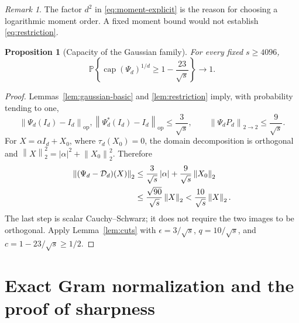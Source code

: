 \documentclass[11pt]{article}
\newtheorem{proposition}[theorem]{Proposition}
\theoremstyle{remark}
\newtheorem{remark}[theorem]{Remark}
\DeclareMathOperator{\capop}{cap}
\newcommand{\Prob}{\mathbb P}
\newcommand{\Dep}{\mathcal D}
\newcommand{\op}{\mathrm{op}}
\newcommand{\hs}{2\to2}
\newcommand{\norm}[1]{\left\lVert#1\right\rVert}
\newcommand{\abs}[1]{\left\lvert#1\right\rvert}
\begin{document}
\begin{remark}
The factor $d^2$ in \eqref{eq:moment-explicit} is the reason
for choosing a logarithmic moment order. A fixed moment bound
would not establish \eqref{eq:restriction}.
\end{remark}

\begin{proposition}[Capacity of the Gaussian family]\label{prop:randomcap}
For every fixed $s\geq4096$,
\begin{equation}
 \Prob\left\{
  \capop(\Psi_d)^{1/d}\geq1-\frac{23}{\sqrt{s}}
       \right\}\longrightarrow1. \label{eq:randomcap}
\end{equation}
\end{proposition}

\begin{proof}
Lemmas~\ref{lem:gaussian-basic} and \ref{lem:restriction} imply,
with probability tending to one,
\[
 \norm{\Psi_d(I_d)-I_d}_{\op},
 \norm{\Psi_d^*(I_d)-I_d}_{\op}\leq\frac3{\sqrt{s}},
 \qquad
 \norm{\Psi_dP_d}_{\hs}\leq\frac9{\sqrt{s}}.
\]
For $X=\alpha I_d+X_0$, where $\tau_d(X_0)=0$, the domain
decomposition is orthogonal and
$\norm{X}_2^2=\abs{\alpha}^2+\norm{X_0}_2^2$. Therefore
\begin{align}
 \norm{(\Psi_d-\Dep_d)(X)}_2
  &\leq\frac3{\sqrt{s}}\abs{\alpha}
                 +\frac9{\sqrt{s}}\norm{X_0}_2 \notag\\
  &\leq\frac{\sqrt{90}}{\sqrt{s}}\norm{X}_2
   <\frac{10}{\sqrt{s}}\norm{X}_2. \label{eq:orthogonal-domain}
\end{align}
The last step is scalar Cauchy--Schwarz; it does not require
the two images to be orthogonal.
Apply Lemma~\ref{lem:cuts} with
$\epsilon=3/\sqrt{s}$, $q=10/\sqrt{s}$, and
$c=1-23/\sqrt{s}\geq1/2$.
\end{proof}

\section{Exact Gram normalization and the proof of sharpness}
\label{sec:normalization}
\end{document}

